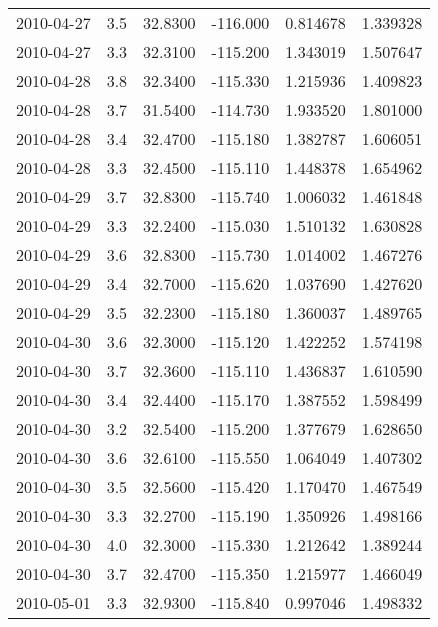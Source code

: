 \begin{tabular}{lrrrrr}
2010-04-27 &       3.5 &  32.8300 &  -116.000 &         0.814678 &         1.339328 \\
2010-04-27 &       3.3 &  32.3100 &  -115.200 &         1.343019 &         1.507647 \\
2010-04-28 &       3.8 &  32.3400 &  -115.330 &         1.215936 &         1.409823 \\
2010-04-28 &       3.7 &  31.5400 &  -114.730 &         1.933520 &         1.801000 \\
2010-04-28 &       3.4 &  32.4700 &  -115.180 &         1.382787 &         1.606051 \\
2010-04-28 &       3.3 &  32.4500 &  -115.110 &         1.448378 &         1.654962 \\
2010-04-29 &       3.7 &  32.8300 &  -115.740 &         1.006032 &         1.461848 \\
2010-04-29 &       3.3 &  32.2400 &  -115.030 &         1.510132 &         1.630828 \\
2010-04-29 &       3.6 &  32.8300 &  -115.730 &         1.014002 &         1.467276 \\
2010-04-29 &       3.4 &  32.7000 &  -115.620 &         1.037690 &         1.427620 \\
2010-04-29 &       3.5 &  32.2300 &  -115.180 &         1.360037 &         1.489765 \\
2010-04-30 &       3.6 &  32.3000 &  -115.120 &         1.422252 &         1.574198 \\
2010-04-30 &       3.7 &  32.3600 &  -115.110 &         1.436837 &         1.610590 \\
2010-04-30 &       3.4 &  32.4400 &  -115.170 &         1.387552 &         1.598499 \\
2010-04-30 &       3.2 &  32.5400 &  -115.200 &         1.377679 &         1.628650 \\
2010-04-30 &       3.6 &  32.6100 &  -115.550 &         1.064049 &         1.407302 \\
2010-04-30 &       3.5 &  32.5600 &  -115.420 &         1.170470 &         1.467549 \\
2010-04-30 &       3.3 &  32.2700 &  -115.190 &         1.350926 &         1.498166 \\
2010-04-30 &       4.0 &  32.3000 &  -115.330 &         1.212642 &         1.389244 \\
2010-04-30 &       3.7 &  32.4700 &  -115.350 &         1.215977 &         1.466049 \\
2010-05-01 &       3.3 &  32.9300 &  -115.840 &         0.997046 &         1.498332 \\

\end{tabular}

